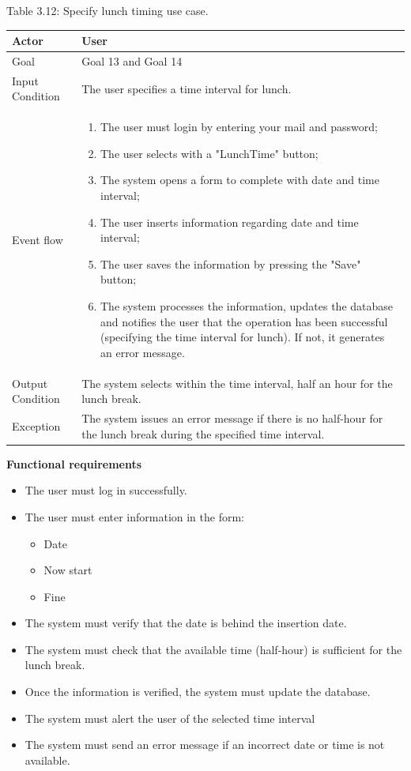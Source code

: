 \documentclass{article}
\begin{document}
	\begin{center}
		Table 3.12: Specify lunch timing use case.
		
		\bigskip
    		\begin{tabular}{p{}|p{}}
   		 	\hline
    			Actor & User \\ \hline
    			Goal & Goal 13 and Goal 14 \\ \hline
    			Input Condition & The user specifies a time interval for lunch. \\ \hline
    			Event flow & 
			\begin{enumerate}
  				\item The user must login by entering your mail and password;
  				\item The user selects with a "LunchTime" button;
  				\item The system opens a form to complete with date and time interval;
  				\item The user inserts information regarding date and time interval;
  				\item The user saves the information by pressing the "Save" button;
  				\item The system processes the information, updates the database and notifies the user that the operation has been successful (specifying the time interval for lunch). If not, it generates an error message.
 			 \end{enumerate} \\ \hline
    			Output Condition & The system selects within the time interval, half an hour for the lunch break. \\ \hline
    			Exception & The system issues an error message if there is no half-hour for the lunch break during the specified time interval. \\ \hline
    		\end{tabular}
	\end{center}
	
	\bigskip
	\noindent
	\textbf{Functional requirements} \\
	\begin{itemize}
		\item The user must log in successfully.
		\item The user must enter information in the form:
			\begin{itemize}
				\item Date
				\item Now start
				\item Fine
			\end{itemize}
		\item The system must verify that the date is behind the insertion date.
		\item The system must check that the available time (half-hour) is sufficient for the lunch break.
		\item Once the information is verified, the system must update the database.
		\item The system must alert the user of the selected time interval
		\item The system must send an error message if an incorrect date or time is not available.
	\end{itemize}
	
\end{document}
